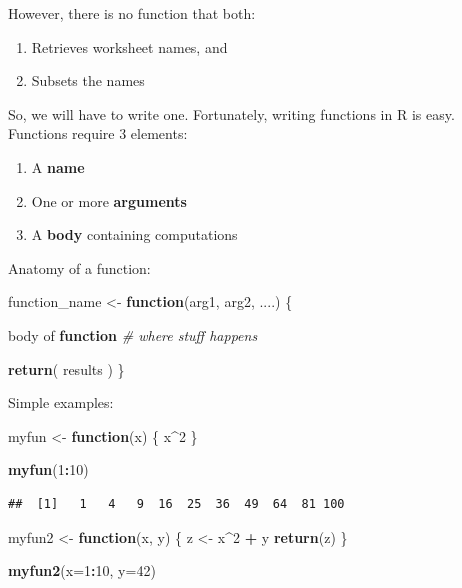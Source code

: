 \documentclass[]{book}
\newenvironment{Shaded}{\begin{snugshade}}{\end{snugshade}}
\newcommand{\CommentTok}[1]{\textcolor[rgb]{0.56,0.35,0.01}{\textit{#1}}}
\newcommand{\ControlFlowTok}[1]{\textcolor[rgb]{0.13,0.29,0.53}{\textbf{#1}}}
\newcommand{\DataTypeTok}[1]{\textcolor[rgb]{0.13,0.29,0.53}{#1}}
\newcommand{\DecValTok}[1]{\textcolor[rgb]{0.00,0.00,0.81}{#1}}
\newcommand{\KeywordTok}[1]{\textcolor[rgb]{0.13,0.29,0.53}{\textbf{#1}}}
\newcommand{\NormalTok}[1]{#1}
\newcommand{\OperatorTok}[1]{\textcolor[rgb]{0.81,0.36,0.00}{\textbf{#1}}}
\newcommand{\StringTok}[1]{\textcolor[rgb]{0.31,0.60,0.02}{#1}}
\providecommand{\tightlist}{%
  \setlength{\itemsep}{0pt}\setlength{\parskip}{0pt}}
\begin{document}
However, there is no function that both:

\begin{enumerate}
\def\labelenumi{\arabic{enumi}.}
\tightlist
\item
  Retrieves worksheet names, and
\item
  Subsets the names
\end{enumerate}

So, we will have to write one. Fortunately, writing functions in R is easy.
Functions require 3 elements:

\begin{enumerate}
\def\labelenumi{\arabic{enumi}.}
\tightlist
\item
  A \textbf{name}
\item
  One or more \textbf{arguments}
\item
  A \textbf{body} containing computations
\end{enumerate}

Anatomy of a function:

\begin{Shaded}
\begin{Highlighting}[]
\NormalTok{function_name <-}\StringTok{ }\ControlFlowTok{function}\NormalTok{(arg1, arg2, ....) \{}
  
\NormalTok{    body of }\ControlFlowTok{function} \CommentTok{# where stuff happens }

    \KeywordTok{return}\NormalTok{( results ) }
\NormalTok{\}}
\end{Highlighting}
\end{Shaded}

Simple examples:

\begin{Shaded}
\begin{Highlighting}[]
\NormalTok{myfun <-}\StringTok{ }\ControlFlowTok{function}\NormalTok{(x) \{}
\NormalTok{  x}\OperatorTok{^}\DecValTok{2}
\NormalTok{\}}

\KeywordTok{myfun}\NormalTok{(}\DecValTok{1}\OperatorTok{:}\DecValTok{10}\NormalTok{)}
\end{Highlighting}
\end{Shaded}

\begin{verbatim}
##  [1]   1   4   9  16  25  36  49  64  81 100
\end{verbatim}

\begin{Shaded}
\begin{Highlighting}[]
\NormalTok{myfun2 <-}\StringTok{ }\ControlFlowTok{function}\NormalTok{(x, y) \{}
\NormalTok{  z <-}\StringTok{ }\NormalTok{x}\OperatorTok{^}\DecValTok{2} \OperatorTok{+}\StringTok{ }\NormalTok{y}
  \KeywordTok{return}\NormalTok{(z)}
\NormalTok{\}}

\KeywordTok{myfun2}\NormalTok{(}\DataTypeTok{x=}\DecValTok{1}\OperatorTok{:}\DecValTok{10}\NormalTok{, }\DataTypeTok{y=}\DecValTok{42}\NormalTok{)}
\end{Highlighting}
\end{Shaded}
\end{document}
